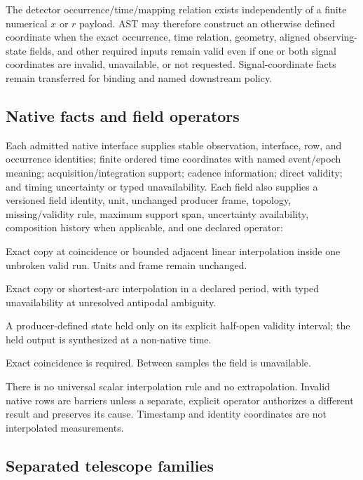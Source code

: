 The detector occurrence/time/mapping relation exists independently of a
finite numerical \(x\) or \(r\) payload.  AST may therefore construct an
otherwise defined coordinate when the exact occurrence, time relation,
geometry, aligned observing-state fields, and other required inputs remain
valid even if one or both signal coordinates are invalid, unavailable, or not
requested.  Signal-coordinate facts remain transferred for binding and named
downstream policy.

\subsection{Native facts and field operators}

Each admitted native interface supplies stable observation, interface, row,
and occurrence identities; finite ordered time coordinates with named
event/epoch meaning; acquisition/integration support; cadence information;
direct validity; and timing uncertainty or typed unavailability.  Each field
also supplies a versioned field identity, unit, unchanged producer frame,
topology, missing/validity rule, maximum support span, uncertainty
availability, composition history when applicable, and one declared operator:

\begin{description}[style=multiline,leftmargin=0.25\linewidth,labelwidth=0.22\linewidth]
\item[Continuous scalar] Exact copy at coincidence or bounded adjacent linear
interpolation inside one unbroken valid run.  Units and frame remain unchanged.
\item[Circular angle] Exact copy or shortest-arc interpolation in a declared
period, with typed unavailability at unresolved antipodal ambiguity.
\item[Declared step state] A producer-defined state held only on its explicit
half-open validity interval; the held output is synthesized at a non-native
time.
\item[Exact-only] Exact coincidence is required.  Between samples the field is
unavailable.
\end{description}

There is no universal scalar interpolation rule and no extrapolation.  Invalid
native rows are barriers unless a separate, explicit operator authorizes a
different result and preserves its cause.  Timestamp and identity coordinates
are not interpolated measurements.

\subsection{Separated telescope families}

